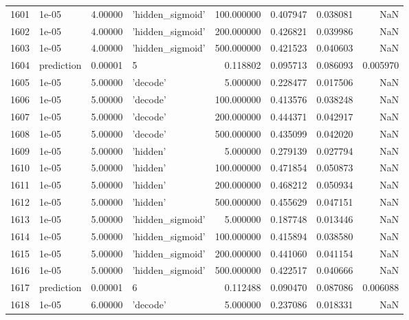 \documentclass[10pt,a4paper]{article}
\begin{document}
\begin{tabular}{llrlrrrr}
1601 &       1e-05 &   4.00000 &   'hidden\_sigmoid' &  100.000000 &  0.407947 &  0.038081 &       NaN \\
1602 &       1e-05 &   4.00000 &   'hidden\_sigmoid' &  200.000000 &  0.426821 &  0.039986 &       NaN \\
1603 &       1e-05 &   4.00000 &   'hidden\_sigmoid' &  500.000000 &  0.421523 &  0.040603 &       NaN \\
1604 &  prediction &   0.00001 &                  5 &    0.118802 &  0.095713 &  0.086093 &  0.005970 \\
1605 &       1e-05 &   5.00000 &           'decode' &    5.000000 &  0.228477 &  0.017506 &       NaN \\
1606 &       1e-05 &   5.00000 &           'decode' &  100.000000 &  0.413576 &  0.038248 &       NaN \\
1607 &       1e-05 &   5.00000 &           'decode' &  200.000000 &  0.444371 &  0.042917 &       NaN \\
1608 &       1e-05 &   5.00000 &           'decode' &  500.000000 &  0.435099 &  0.042020 &       NaN \\
1609 &       1e-05 &   5.00000 &           'hidden' &    5.000000 &  0.279139 &  0.027794 &       NaN \\
1610 &       1e-05 &   5.00000 &           'hidden' &  100.000000 &  0.471854 &  0.050873 &       NaN \\
1611 &       1e-05 &   5.00000 &           'hidden' &  200.000000 &  0.468212 &  0.050934 &       NaN \\
1612 &       1e-05 &   5.00000 &           'hidden' &  500.000000 &  0.455629 &  0.047151 &       NaN \\
1613 &       1e-05 &   5.00000 &   'hidden\_sigmoid' &    5.000000 &  0.187748 &  0.013446 &       NaN \\
1614 &       1e-05 &   5.00000 &   'hidden\_sigmoid' &  100.000000 &  0.415894 &  0.038580 &       NaN \\
1615 &       1e-05 &   5.00000 &   'hidden\_sigmoid' &  200.000000 &  0.441060 &  0.041154 &       NaN \\
1616 &       1e-05 &   5.00000 &   'hidden\_sigmoid' &  500.000000 &  0.422517 &  0.040666 &       NaN \\
1617 &  prediction &   0.00001 &                  6 &    0.112488 &  0.090470 &  0.087086 &  0.006088 \\
1618 &       1e-05 &   6.00000 &           'decode' &    5.000000 &  0.237086 &  0.018331 &       NaN \\

\end{tabular}
\end{document}
